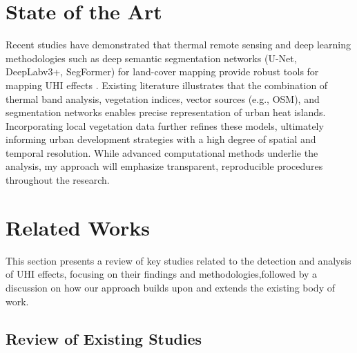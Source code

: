 \documentclass{article}
\begin{document}
\section{State of the Art}
Recent studies have demonstrated that thermal remote sensing and deep learning methodologies such as deep semantic segmentation networks (U-Net, DeepLabv3+, SegFormer) for land-cover mapping provide robust tools for mapping UHI effects \parencite{Lin_2024}. Existing literature illustrates that the combination of thermal band analysis, vegetation indices, vector sources (e.g., OSM), and segmentation networks enables precise representation of urban heat islands. Incorporating local vegetation data further refines these models, ultimately informing urban development strategies with a high degree of spatial and temporal resolution. While advanced computational methods underlie the analysis, my approach will emphasize transparent, reproducible procedures throughout the research.

\clearpage

\section{Related Works}

This section presents a review of key studies related to the detection and analysis of UHI effects, focusing on their findings and methodologies,followed by a discussion on how our approach builds upon and extends the existing body of work.

\subsection{Review of Existing Studies}
\end{document}
